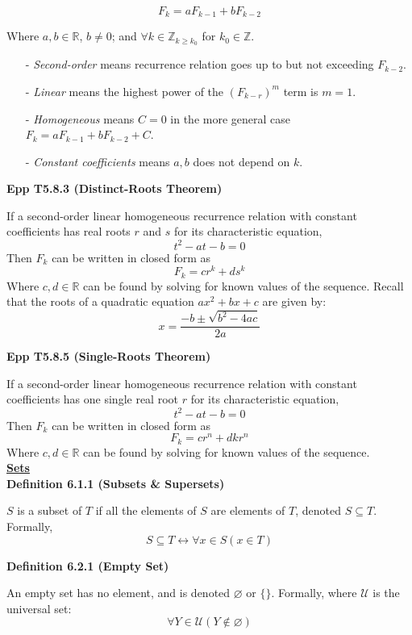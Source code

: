 \documentclass[a4paper]{article}
\newcommand{\heading}[1]{{\small\underline{\textbf{#1}}}}
\newcommand{\subheading}[1]{{\scriptsize\textbf{#1}}}
\begin{document}
\begin{multicols*}{4}
$$F_k = aF_{k-1} + bF_{k-2}$$

Where $a, b \in \mathbb{R}$, $b \neq 0$; and $\forall k \in \mathbb{Z}_{k \geq
k_0}$ for $k_0 \in \mathbb{Z}$.

\begin{itemize}[leftmargin=*] \itemsep -0.5em
\item[-] \textit{Second-order} means recurrence relation goes up to but not
  exceeding $F_{k-2}$.
\item[-] \textit{Linear} means the highest power of the $(F_{k-r})^m$ term is
  $m=1$.
\item[-] \textit{Homogeneous} means $C=0$ in the more general case $F_k =
  aF_{k-1} + bF_{k-2} + C$.
\item[-] \textit{Constant coefficients} means $a, b$ does not depend on $k$.
\end{itemize}

\subheading{Epp T5.8.3 (Distinct-Roots Theorem)}

If a second-order linear homogeneous recurrence relation with constant
coefficients has real roots $r$ and $s$ for its characteristic equation,
$$t^2 - at - b = 0$$
Then $F_k$ can be written in closed form as
$$F_k = cr^k + ds^k$$
Where $c, d \in \mathbb{R}$ can be found by solving for known values of the
sequence. Recall that the roots of a quadratic equation $ax^2 + bx + c$ are
given by: $$x=\frac{-b \pm \sqrt{b^2 - 4ac}}{2a}$$

\subheading{Epp T5.8.5 (Single-Roots Theorem)}

If a second-order linear homogeneous recurrence relation with constant
coefficients has one single real root $r$ for its characteristic equation,
$$t^2 - at - b = 0$$
Then $F_k$ can be written in closed form as
$$F_k = cr^n + dkr^n$$
Where $c, d \in \mathbb{R}$ can be found by solving for known values of the
sequence.\\

\heading{Sets} \\

\subheading{Definition 6.1.1 (Subsets \& Supersets)}

$S$ is a subset of $T$ if all the elements of $S$ are elements of $T$, denoted
$S \subseteq T$. Formally, $$S \subseteq T \longleftrightarrow \forall x \in S
(x \in T)$$

\subheading{Definition 6.2.1 (Empty Set)}

An empty set has no element, and is denoted $\varnothing$ or $\{\}$. Formally,
where $\mathcal{U}$ is the universal set: $$\forall Y \in \mathcal{U} (Y \not\in
\varnothing)$$


\end{multicols*}
\end{document}
